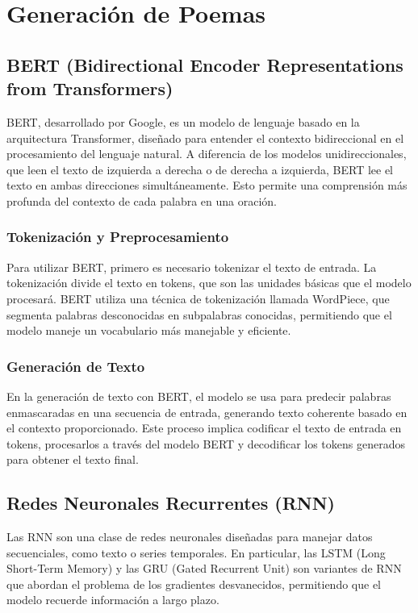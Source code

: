 \section{Generación de Poemas}

\subsection{BERT (Bidirectional Encoder Representations from Transformers)}

BERT, desarrollado por Google, es un modelo de lenguaje basado en la arquitectura Transformer, diseñado para entender el contexto bidireccional en el procesamiento del lenguaje natural. A diferencia de los modelos unidireccionales, que leen el texto de izquierda a derecha o de derecha a izquierda, BERT lee el texto en ambas direcciones simultáneamente. Esto permite una comprensión más profunda del contexto de cada palabra en una oración.

\subsubsection*{Tokenización y Preprocesamiento}
Para utilizar BERT, primero es necesario tokenizar el texto de entrada. La tokenización divide el texto en tokens, que son las unidades básicas que el modelo procesará. BERT utiliza una técnica de tokenización llamada WordPiece, que segmenta palabras desconocidas en subpalabras conocidas, permitiendo que el modelo maneje un vocabulario más manejable y eficiente.

\subsubsection*{Generación de Texto}
En la generación de texto con BERT, el modelo se usa para predecir palabras enmascaradas en una secuencia de entrada, generando texto coherente basado en el contexto proporcionado. Este proceso implica codificar el texto de entrada en tokens, procesarlos a través del modelo BERT y decodificar los tokens generados para obtener el texto final.

\subsection{Redes Neuronales Recurrentes (RNN)}

Las RNN son una clase de redes neuronales diseñadas para manejar datos secuenciales, como texto o series temporales. En particular, las LSTM (Long Short-Term Memory) y las GRU (Gated Recurrent Unit) son variantes de RNN que abordan el problema de los gradientes desvanecidos, permitiendo que el modelo recuerde información a largo plazo.

